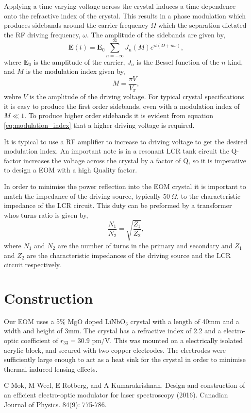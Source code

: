 \documentclass{article}
\begin{document}
Applying a time varying voltage across the crystal induces a time dependence
onto the refractive index of the crystal. This results in a phase modulation
which produces sidebands around the carrier frequency $\Omega$ which the separation
dictated the RF driving frequency, $\omega$. The amplitude of the sidebands are given by,
\begin{equation}
    \mathbf{E}(t) = \mathbf{E}_0\sum_{n=-\infty}^{\infty}J_n(M)e^{it(\Omega+n\omega)},
\end{equation}
where $\mathbf{E}_0$ is the amplitude of the carrier, $J_n$ is the Bessel
function of the $n$ kind, and $M$ is the modulation index given by,
\begin{equation}\label{eq:modulation_index}
    M = \frac{\pi V}{V_{\pi}},
\end{equation}
wehre $V$ is the amplitude of the driving voltage. For typical crystal specifications it 
is easy to produce the first order sidebands, even with a modulation index of $M\ll 1$. 
To produce higher order sidebands it is evident from equation \ref{eq:modulation_index} that
a higher driving voltage is required. 

It is typical to use a RF amplifier to increase to driving voltage to get the
desired modulation index. An important note is in a resonant LCR tank circuit
the Q-factor increases the voltage across the crystal by a factor of Q, so it is
imperative to design a EOM with a high Quality factor.

In order to minimise the power reflection into the EOM crystal it is important
to match the impedance of the driving source, typically 50$~\Omega$, to the
characteristic impedance of the LCR circuit. This duty can be preformed by
a transformer whos turns ratio is given by,
\begin{equation}
    \frac{N_1}{N_2} = \sqrt{\frac{Z_1}{Z_2}},
\end{equation}
where $N_1$ and $N_2$ are the number of turns in the primary and secondary and
$Z_1$ and $Z_2$ are the characteristic impedances of the driving source and the
LCR circuit respectively.

\section{Construction}

Our EOM uses a 5\% MgO doped LiNbO$_3$ crystal with a length of 40mm and a width
and height of 3mm. The crystal has a refractive index of 2.2 and a electro-optic
coefficient of $r_{33}=30.9$ pm/V. This was mounted on a electrically isolated
acrylic block, and secured with two copper electrodes. The electrodes were
sufficiently large enough to act as a heat sink for the crystal in order to
minimise thermal induced lensing effects.


\begin{thebibliography}{9}
    C Mok, M Weel, E Rotberg, and A Kumarakrishnan. Design and construction of
    an efficient electro-optic modulator for laser spectroscopy (2016). Canadian
    Journal of Physics. 84(9): 775-786.
\end{thebibliography}    
\end{document}
